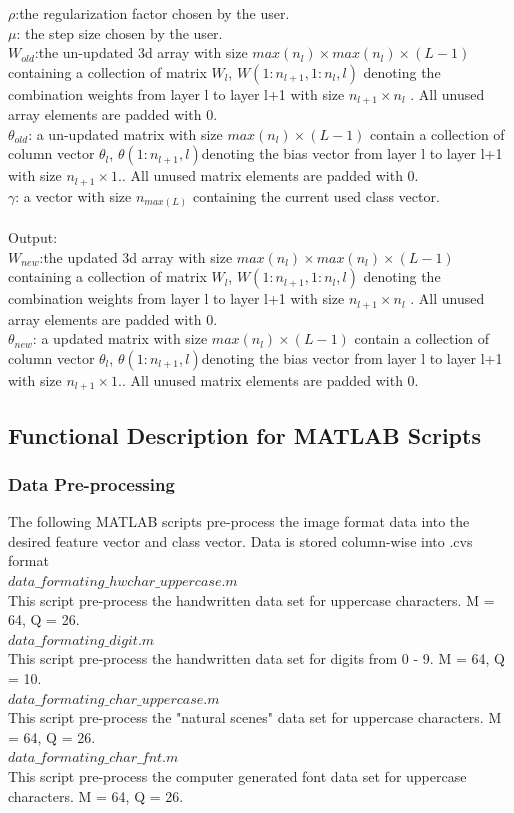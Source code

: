 \documentclass[journal,a4paper,onecolumn,11pt]{IEEEtran}
\begin{document}
$\rho$:the regularization factor chosen by the user.\\
$\mu$: the step size chosen by the user.\\
$W_{old}$:the un-updated 3d array with size $max(n_{l})\times max(n_{l}) \times (L-1)$ containing a collection of matrix $W_{l}$, $W(1:n_{l+1},1:n_{l},l)$ denoting the combination weights from layer l to layer l+1 with size $n_{l+1} \times n_{l}$ . All unused array elements are padded with 0. \\
$\theta_{old}$: a un-updated matrix with size $max(n_{l}) \times (L-1)$ contain a collection of column vector $\theta_{l}$, $\theta(1:n_{l+1},l)$denoting the bias vector from layer l to layer l+1 with size $n_{l+1} \times 1$.. All unused matrix elements are padded with 0. \\ 
$\gamma$: a vector with size $n_{max(L)}$ containing the current used class vector. \\\\
Output:\\
$W_{new}$:the updated 3d array with size $max(n_{l})\times max(n_{l}) \times (L-1)$ containing a collection of matrix $W_{l}$, $W(1:n_{l+1},1:n_{l},l)$ denoting the combination weights from layer l to layer l+1 with size $n_{l+1} \times n_{l}$ . All unused array elements are padded with 0. \\
$\theta_{new}$: a updated matrix with size $max(n_{l}) \times (L-1)$ contain a collection of column vector $\theta_{l}$, $\theta(1:n_{l+1},l)$denoting the bias vector from layer l to layer l+1 with size $n_{l+1} \times 1$.. All unused matrix elements are padded with 0. \\ 
\pagebreak
\subsection{Functional Description for MATLAB Scripts}
\subsubsection{Data Pre-processing}
The following MATLAB scripts pre-process the image format data into the desired feature vector and class vector. Data is stored column-wise into .cvs format  \\
$data\_formating\_hwchar\_uppercase.m$\\ This script pre-process the handwritten data set for uppercase characters. M = 64, Q = 26.\\
$data\_formating\_digit.m$\\
This script pre-process the handwritten data set for digits from 0 - 9. M = 64, Q = 10.\\
$data\_formating\_char\_uppercase.m$\\
This script pre-process the "natural scenes" data set for uppercase characters. M = 64, Q = 26.\\
$data\_formating\_char\_fnt.m$\\
This script pre-process the computer generated font data set for uppercase characters. M = 64, Q = 26.\\
\end{document}
